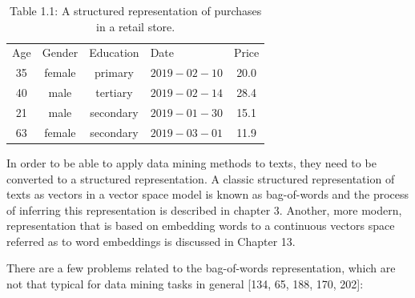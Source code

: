 \documentclass[11pt,openany,executivepaper]{book}
\begin{document}
\begin{table}[ht!]
  
\begin{center}
\captionsetup{labelformat=empty}
\caption{Table 1.1: A structured representation of purchases in a retail store.}
\begin{tabular}{ccclc}
\hline
Age & Gender & Education & Date & Price \\
35 & female & primary & $2019-02-10$ & 20.0 \\
40 & male & tertiary & $2019-02-14$ & 28.4 \\
21 & male & secondary & $2019-01-30$ & 15.1 \\
63 & female & secondary & $2019-03-01$ & 11.9 \\
\hline
\end{tabular}
\end{center}
\end{table}
\begin{sloppypar}
\raggedbottom
In order to be able to apply data mining methods to texts, they need to be converted to a structured representation. A classic structured representation of texts as vectors in a vector space model is known as bag-of-words and the process of inferring this representation is described in chapter 3. Another, more modern, representation that is based on embedding words to a continuous vectors space referred as to word embeddings is discussed in Chapter 13.

There are a few problems related to the bag-of-words representation, which are not that typical for data mining tasks in general [134, 65, 188, 170, 202]:
\end{sloppypar}
\end{document}
